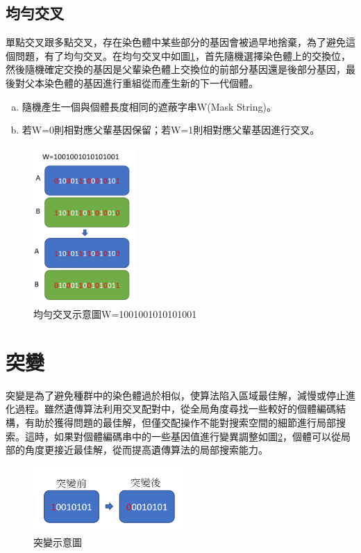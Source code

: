 	      \subsection{均勻交叉}
	      單點交叉跟多點交叉，存在染色體中某些部分的基因會被過早地捨棄，為了避免這個問題，有了均勻交叉。在均勻交叉中如圖\ref{fig:avg}，首先隨機選擇染色體上的交換位，然後隨機確定交換的基因是父輩染色體上交換位的前部分基因還是後部分基因，最後對父本染色體的基因進行重組從而產生新的下一代個體。
	      \begin{enumerate}[(a)]
		      \item
		            隨機產生一個與個體長度相同的遮蔽字串W(Mask String)。

		      \item
		            若W=0則相對應父輩基因保留；若W=1則相對應父輩基因進行交叉。
	      \end{enumerate}
	      \begin{figure}[H]
		      \centerline{\includegraphics[height=6cm]{pic/AVG.PNG}}
		      \caption{均勻交叉示意圖W=1001001010101001}
		      \label{fig:avg}
	      \end{figure}






\section{突變}
突變是為了避免種群中的染色體過於相似，使算法陷入區域最佳解，減慢或停止進化過程。雖然遺傳算法利用交叉配對中，從全局角度尋找一些較好的個體編碼結構，有助於獲得問題的最佳解，但僅交配操作不能對搜索空間的細節進行局部搜索。這時，如果對個體編碼串中的一些基因值進行變異調整如圖\ref{fig:GAmut}，個體可以從局部的角度更接近最佳解，從而提高遺傳算法的局部搜索能力。

\begin{figure}[H]
	\centerline{\includegraphics[height=2.5cm]{pic/GAmut.PNG}}
	\caption{突變示意圖}
	\label{fig:GAmut}
\end{figure}
